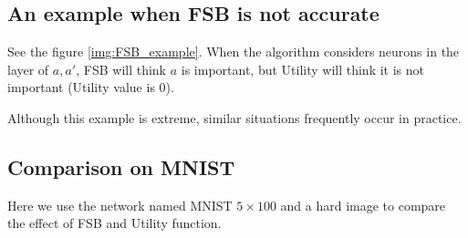 \iffalse
\begin{figure}[t!]
\begin{tikzpicture}[scale=1, >=stealth]
	
	\draw[->] (-5,0) -- (4,0) node[right] {$b$};
	\draw[->] (0,-1) -- (0,3) node[above] {$\hat{b}$};
	
	\draw[line width=0.4mm, blue] (-3,0) -- (0,0);
	\draw[thick, blue] (0,0) -- (2.5,2.5) node[below, shift={(-1.1,-1.9)}] {$\hat{b} = \ReLU(b)$};
	\draw[thick, blue] (-3,0) -- (2.5,2.5) node[above, shift={(-6.5,-2)}] {$\hat{b} = \frac{\UB}{\UB-\LB} b-\frac{\UB\cdot\LB}{\UB-\LB}$};
	
	\draw[dashed] (2.5,0) -- (2.5,2.5) -- (0,2.5); %
	\node[below left] at (0,0) {$0$};
	
	
	\foreach \x in {2.5}
	\draw[shift={(\x,0)}] (0,0.1) -- (0,-0.1) node[below] {$\UB$};
	\foreach \x in {-3}
	\draw[shift={(\x,0)}] (0,0.1) -- (0,-0.1) node[below] {$\LB$};

	\foreach \y in {2.5}
	\draw[shift={(0,\y)}] (0.1,0) -- (-0.1,0) node[left] {$\UB$};
	
	\draw (-1,0.1) -- (-1,-0.1) node[below] {$\sol(b)$};
	\draw[dashed] (-1,0) -- (-1,0.9) -- (0,0.9);
	\draw (-0.1,0.9) -- (0.1,0.9) node[right, shift={(-0.1,0.13)}] {$\sol(\hat{b})$};
	\node at (-0.5,0.4) {$\Delta(b)$};
	
\end{tikzpicture}
	\caption{}
\label{img:Utility}
\end{figure}
\fi


\iffalse
\subsection*{An example when FSB is not accurate}

See the figure \ref{img:FSB_example}. When the algorithm considers neurons in the layer of $a,a'$, FSB will think $a$ is important, but Utility will think it is not important (Utility value is 0).

Although this example is extreme, similar situations frequently occur in practice.

\subsection*{Comparison on MNIST}

Here we use the network named MNIST $5\times 100$ and a hard image to compare the effect of FSB and Utility function. 

